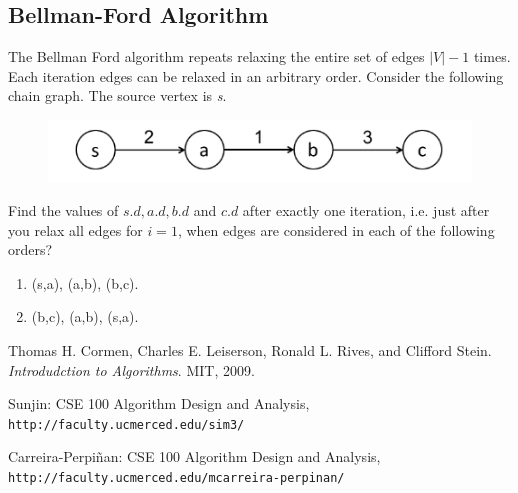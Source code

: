 \documentclass[11pt,fleqn]{book}
\begin{document}
\subsection{Bellman-Ford Algorithm}
\begin{example}
The Bellman Ford algorithm repeats relaxing the entire set of edges $|V| - 1$ times. Each iteration edges can be relaxed in an arbitrary order. Consider the following chain graph. The source vertex is \textit{s}.
\begin{figure}[H]
    \centering
    \includegraphics{Pictures/bfaChainG.PNG}
    \label{fig:my_label}
\end{figure}
Find the values of $s.d, a.d, b.d$ and $c.d$ after exactly one iteration, i.e. just after you relax all edges for $i = 1$, when edges are considered in each of the following orders? 
\begin{enumerate}[label=(\alph*)]
    \item (s,a), (a,b), (b,c).
    \item (b,c), (a,b), (s,a).
\end{enumerate}
\end{example}



\begin{thebibliography}{9}
Thomas H. Cormen, Charles E. Leiserson, Ronald L. Rives, and Clifford Stein. 
\textit{Introdudction to Algorithms}. 
MIT, 2009.
 
Sunjin: CSE 100 Algorithm Design and Analysis,
\\\texttt{http://faculty.ucmerced.edu/sim3/}

Carreira-Perpiñan: CSE 100 Algorithm Design and Analysis,
\\\texttt{http://faculty.ucmerced.edu/mcarreira-perpinan/}

\end{thebibliography}


\end{document}
